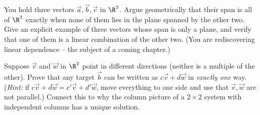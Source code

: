 \begin{exercise}
You hold three vectors $\vec a,\vec b,\vec c$ in $\R^3$. Argue geometrically that their span is all of
$\R^3$ exactly when none of them lies in the plane spanned by the other two. Give an explicit example
of three vectors whose span is only a plane, and verify that one of them is a linear combination of the
other two. (You are rediscovering linear dependence -- the subject of a coming chapter.)
\end{exercise}

\begin{exercise}
Suppose $\vec v$ and $\vec w$ in $\R^2$ point in different directions (neither is a multiple of the
other). Prove that any target $\vec b$ can be written as $c\vec v + d\vec w$ in \emph{exactly one}
way. (\emph{Hint:} if $c\vec v + d\vec w = c'\vec v + d'\vec w$, move everything to one side and use
that $\vec v,\vec w$ are not parallel.) Connect this to why the column picture of a $2\times2$ system
with independent columns has a unique solution.
\end{exercise}
